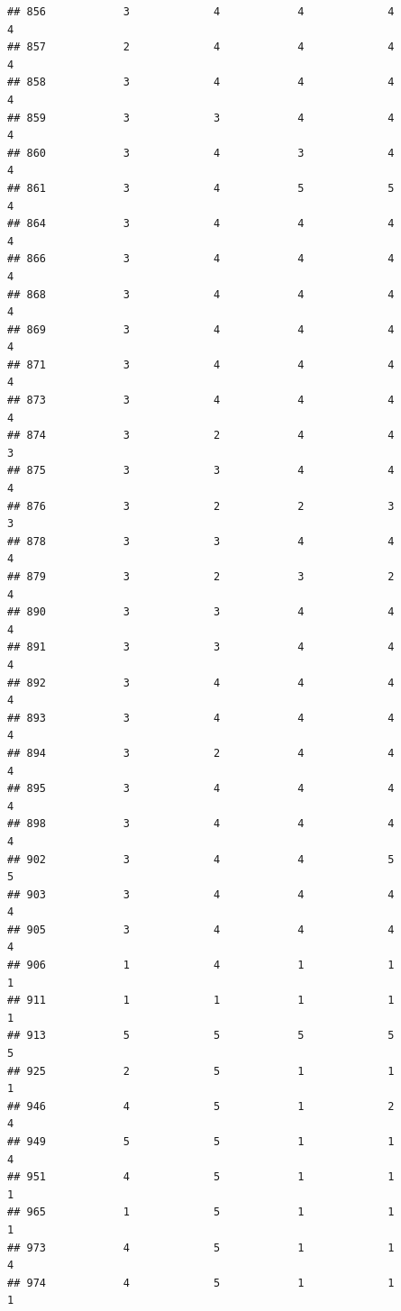 \documentclass[
]{article}
\begin{document}
\begin{verbatim}
## 856            3             4            4             4          4
## 857            2             4            4             4          4
## 858            3             4            4             4          4
## 859            3             3            4             4          4
## 860            3             4            3             4          4
## 861            3             4            5             5          4
## 864            3             4            4             4          4
## 866            3             4            4             4          4
## 868            3             4            4             4          4
## 869            3             4            4             4          4
## 871            3             4            4             4          4
## 873            3             4            4             4          4
## 874            3             2            4             4          3
## 875            3             3            4             4          4
## 876            3             2            2             3          3
## 878            3             3            4             4          4
## 879            3             2            3             2          4
## 890            3             3            4             4          4
## 891            3             3            4             4          4
## 892            3             4            4             4          4
## 893            3             4            4             4          4
## 894            3             2            4             4          4
## 895            3             4            4             4          4
## 898            3             4            4             4          4
## 902            3             4            4             5          5
## 903            3             4            4             4          4
## 905            3             4            4             4          4
## 906            1             4            1             1          1
## 911            1             1            1             1          1
## 913            5             5            5             5          5
## 925            2             5            1             1          1
## 946            4             5            1             2          4
## 949            5             5            1             1          4
## 951            4             5            1             1          1
## 965            1             5            1             1          1
## 973            4             5            1             1          4
## 974            4             5            1             1          1

\end{verbatim}
\end{document}
